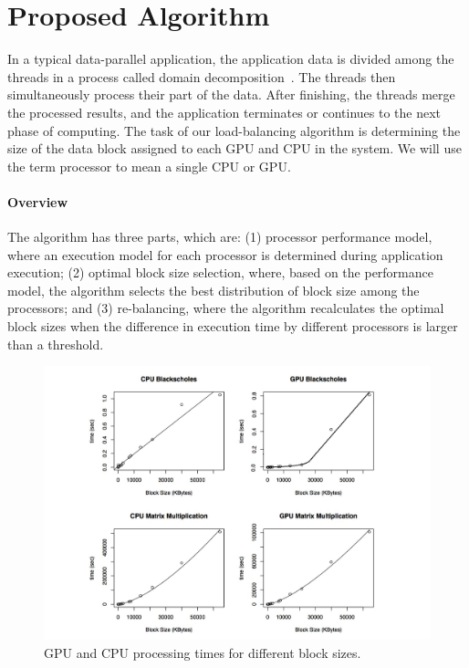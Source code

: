 \documentclass[journal]{IEEEtran}
\begin{document}

\section{Proposed Algorithm}

In a typical data-parallel application, the application data
is divided among the threads in a process called domain
decomposition~\cite{Gropp:1992uq}. The threads then simultaneously process their
part of the data. After finishing, the threads merge the processed results, and
the application terminates or continues to the next phase of computing. The task
of our load-balancing algorithm is determining the size of the data block
assigned to each GPU and CPU in the system. We will use the term processor to
mean a single CPU or GPU.

\vspace{0.2cm}
\paragraph*{Overview} The algorithm has three parts, which are: (1) processor 
performance model, where an execution model for each processor is determined
during application execution; (2) optimal block size selection, where, based on
the performance model, the algorithm selects the best distribution of block size
among the processors; and (3) re-balancing, where the algorithm recalculates the
optimal block sizes when the difference in execution time by different
processors is larger than a threshold.

\begin{figure}[!t]
	\centering
			\includegraphics[scale=0.36]{CPUVersusGPULinear2.pdf} 				
	\caption{GPU and CPU processing times for different block sizes.}
	\label{fig: CPUVersusGPU1}
\end{figure}
\end{document}
